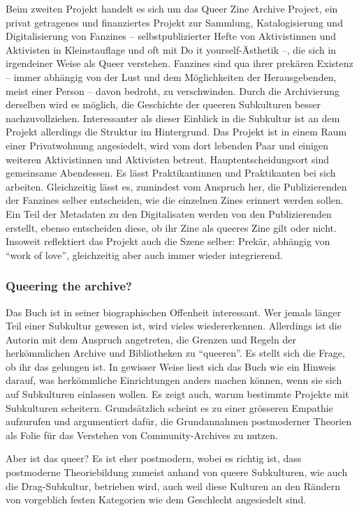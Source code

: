 \documentclass[a4paper,
fontsize=11pt,
oneside,
numbers=noperiodatend,
parskip=half-,
bibliography=totoc,
final
]{scrartcl}
\begin{document}
Beim zweiten Projekt handelt es sich um das Queer Zine Archive Project,
ein privat getragenes und finanziertes Projekt zur Sammlung,
Katalogisierung und Digitalisierung von Fanzines -- selbstpublizierter
Hefte von Aktivistinnen und Aktivisten in Kleinstauflage und oft mit Do
it yourself-Ästhetik --, die sich in irgendeiner Weise als Queer
verstehen. Fanzines sind qua ihrer prekären Existenz -- immer abhängig
von der Lust und dem Möglichkeiten der Herausgebenden, meist einer
Person -- davon bedroht, zu verschwinden. Durch die Archivierung
derselben wird es möglich, die Geschichte der queeren Subkulturen besser
nachzuvollziehen. Interessanter als dieser Einblick in die Subkultur ist
an dem Projekt allerdings die Struktur im Hintergrund. Das Projekt ist
in einem Raum einer Privatwohnung angesiedelt, wird vom dort lebenden
Paar und einigen weiteren Aktivistinnen und Aktivisten betreut.
Hauptentscheidungsort sind gemeinsame Abendessen. Es lässt
Praktikantinnen und Praktikanten bei sich arbeiten. Gleichzeitig lässt
es, zumindest vom Anspruch her, die Publizierenden der Fanzines selber
entscheiden, wie die einzelnen Zines erinnert werden sollen. Ein Teil
der Metadaten zu den Digitalisaten werden von den Publizierenden
erstellt, ebenso entscheiden diese, ob ihr Zine als queeres Zine gilt
oder nicht. Insoweit reflektiert das Projekt auch die Szene selber:
Prekär, abhängig von \enquote{work of love}, gleichzeitig aber auch
immer wieder integrierend.

\subsubsection{Queering the archive?}\label{queering-the-archive}

Das Buch ist in seiner biographischen Offenheit interessant. Wer jemals
länger Teil einer Subkultur gewesen ist, wird vieles wiedererkennen.
Allerdings ist die Autorin mit dem Anspruch angetreten, die Grenzen und
Regeln der herkömmlichen Archive und Bibliotheken zu \enquote{queeren}.
Es stellt sich die Frage, ob ihr das gelungen ist. In gewisser Weise
liest sich das Buch wie ein Hinweis darauf, was herkömmliche
Einrichtungen anders machen können, wenn sie sich auf Subkulturen
einlassen wollen. Es zeigt auch, warum bestimmte Projekte mit
Subkulturen scheitern. Grundsätzlich scheint es zu einer grösseren
Empathie aufzurufen und argumentiert dafür, die Grundannahmen
postmoderner Theorien als Folie für das Verstehen von Community-Archives
zu nutzen.

Aber ist das queer? Es ist eher postmodern, wobei es richtig ist, dass
postmoderne Theoriebildung zumeist anhand von queere Subkulturen, wie
auch die Drag-Subkultur, betrieben wird, auch weil diese Kulturen an den
Rändern von vorgeblich festen Kategorien wie dem Geschlecht angesiedelt
sind.
\end{document}
